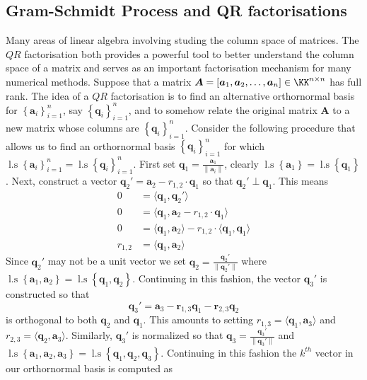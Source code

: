 \subsection{Gram-Schmidt Process and QR factorisations}\label{Section4.2}

Many areas of linear algebra involving studing the column space of matrices. The $QR$ factorisation both provides a powerful tool to better understand the column space of a matrix and serves as an important factorisation mechanism for many numerical methods. Suppose that a matrix $\bm{A} = \left[ \bm{a}_1 , \bm{a}_2 , \ldots , \bm{a}_n \right] \in \KK^{n \times n}$ has full rank. The idea of a $QR$ factorisation is to find an alternative orthornormal basis for $\left\{ \bm{a}_i \right\}_{i=1}^{n}$, say $\left\{ \bm{q}_i \right\}_{i=1}^{n}$, and to somehow relate the original matrix $\bm{A}$ to a new matrix whose columns are $\left\{ \bm{q}_i \right\}_{i=1}^{n}$. Consider the following procedure that allows us to find an orthornormal basis $\left\{ \bm{q}_i \right\}_{i=1}^{n}$ for which $\operatorname{l.s} \left\{ \bm{a}_i \right\}_{i=1}^{n} = \operatorname{l.s} \left\{ \bm{q}_i \right\}_{i=1}^{n} $. First set $\bm{q}_1 = \frac{\bm{a}_1}{\| \bm{a}_i \|}$, clearly $\operatorname{l.s} \left\{ \bm{a}_1 \right\} = \operatorname{l.s} \left\{ \bm{q}_1 \right\}$. Next, construct a vector $\bm{q}_2' = \bm{a}_2 - r_{1,2} \cdot \bm{q}_1$ so that $\bm{q}_2' \perp \bm{q}_1$. This means
\begin{align*}
    0       & = \langle \bm{q}_1, \bm{q}_2' \rangle                                                   \\
    0       & = \langle \bm{q}_1, \bm{a}_2 - r_{1,2} \cdot \bm{q}_1 \rangle                           \\
    0       & = \langle \bm{q}_1, \bm{a}_2 \rangle - r_{1,2} \cdot \langle \bm{q}_1, \bm{q}_1 \rangle \\
    r_{1,2} & = \langle \bm{q}_1, \bm{a}_2 \rangle
\end{align*}
Since $\bm{q}_2'$ may not be a unit vector we set $\bm{q}_2 = \frac{\bm{q}_2'}{\| \bm{q}_2' \|}$ where $\operatorname{l.s} \left\{ \bm{a}_1, \bm{a}_2 \right\} = \operatorname{l.s} \left\{ \bm{q}_1, \bm{q}_2 \right\}$. Continuing in this fashion, the vector $\bm{q}_3'$ is constructed so that
\[
    \bm{q}_3' = \bm{a}_3 - \bm{r}_{1,3} \bm{q}_1 - \bm{r}_{2,3} \bm{q}_2
\]
is orthogonal to both $\bm{q}_2$ and $\bm{q}_1$. This amounts to setting $r_{1,3} = \langle \bm{q}_1, \bm{a}_3 \rangle$ and $r_{2,3} = \langle \bm{q}_2, \bm{a}_{3} \rangle$. Similarly, $\bm{q}_3'$ is normalized so that $\bm{q}_3 = \frac{\bm{q}_3'}{\| \bm{q}_3' \|}$ and $\operatorname{l.s} \left\{ \bm{a}_1, \bm{a}_2, \bm{a}_3 \right\} = \operatorname{l.s} \left\{ \bm{q}_1, \bm{q}_2, \bm{q}_3 \right\}$. Continuing in this fashion the $k^{th}$ vector in our orthornormal basis is computed as
